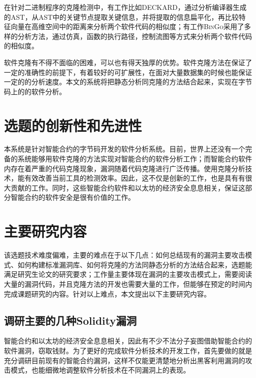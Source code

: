 在针对二进制程序的克隆检测中，有工作比如\textsc{DECKARD}\cite{deckard}，通过分析编译器生成的AST，从AST中的关键节点提取关键信息，并将提取的信息扁平化，再比较特征向量在高维空间中的距离来分析两个软件代码的相似度；有工作\textsc{BinGo}\cite{bingo}采用了多样的分析方法，通过仿真，函数的执行路径，控制流图等方式来分析两个软件代码的相似度。

软件克隆有不得不面临的困难，可以也有得天独厚的优势。软件克隆方法在保证了一定的准确性的前提下，有着较好的可扩展性，在面对大量数据集的时候也能保证一定的的分析速度。本文的系统将把静态分析同克隆的方法结合起来，实现在字节码上的的软件分析。

\section{选题的创新性和先进性}

本系统是针对智能合约的字节码开发的软件分析系统。目前，世界上还没有一个完备的系统能够用软件克隆的方法实现对智能合约的软件分析工作；而智能合约软件内存在着严重的代码克隆现象，漏洞随着代码克隆进行广泛传播。使用克隆分析技术，能有效改善当前工具的检测效率。因此，这不仅是创新的工作，也是具有有很大贡献的工作。同时，这些智能合约软件和以太坊的经济安全息息相关，保证这部分智能合约的软件安全是很有价值的工作。

\section{主要研究内容}

该选题技术难度偏难，主要的难点在于以下几点：如何总结现有的漏洞主要攻击模式、如何构建标准漏洞库、如何将克隆的方法同静态分析的方法结合起来，选题能满足研究生论文的研究要求；工作量主要体现在漏洞的主要攻击模式上，需要阅读大量的漏洞代码，并且克隆方法的开发也需要大量的工作，但能够在预定的时间内完成课题研究的内容。针对以上难点，本文提出以下主要研究内容。

\subsection{调研主要的几种Solidity漏洞}

智能合约和以太坊的经济安全息息相关，因此有不少不法分子妄图借助智能合约的软件漏洞，窃取钱财。为了更好的完成软件分析技术的开发工作，首先要做的就是充分调研目前现有的智能合约漏洞，这样不仅能更清楚地分析出黑客利用漏洞的攻击模式，也能细微地调整软件分析技术在不同漏洞上的表现。

